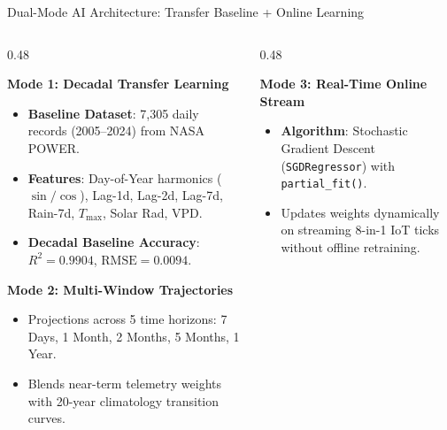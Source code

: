 \documentclass[aspectratio=169,10pt]{beamer}
\begin{document}
\begin{frame}{Dual-Mode AI Architecture: Transfer Baseline + Online Learning}
    \begin{columns}[T]
        \begin{column}{0.48\textwidth}
            \begin{block}{\textbf{Mode 1: Decadal Transfer Learning}}
                \footnotesize
                \begin{itemize}
                    \item \textbf{Baseline Dataset}: 7,305 daily records (2005--2024) from NASA POWER.
                    \item \textbf{Features}: Day-of-Year harmonics ($\sin/\cos$), Lag-1d, Lag-2d, Lag-7d, Rain-7d, $T_{\max}$, Solar Rad, VPD.
                    \item \textbf{Decadal Baseline Accuracy}: $R^2 = 0.9904$, $\text{RMSE} = 0.0094$.
                \end{itemize}
            \end{block}
            \vspace{0.2cm}
            \begin{block}{\textbf{Mode 2: Multi-Window Trajectories}}
                \footnotesize
                \begin{itemize}
                    \item Projections across 5 time horizons: 7 Days, 1 Month, 2 Months, 5 Months, 1 Year.
                    \item Blends near-term telemetry weights with 20-year climatology transition curves.
                \end{itemize}
            \end{block}
        \end{column}
        \begin{column}{0.48\textwidth}
            \begin{exampleblock}{\textbf{Mode 3: Real-Time Online Stream}}
                \footnotesize
                \begin{itemize}
                    \item \textbf{Algorithm}: Stochastic Gradient Descent (\texttt{SGDRegressor}) with \texttt{partial\_fit()}.
                    \item Updates weights dynamically on streaming 8-in-1 IoT ticks without offline retraining.

\end{itemize}
\end{exampleblock}
\end{column}
\end{columns}
\end{frame}
\end{document}
